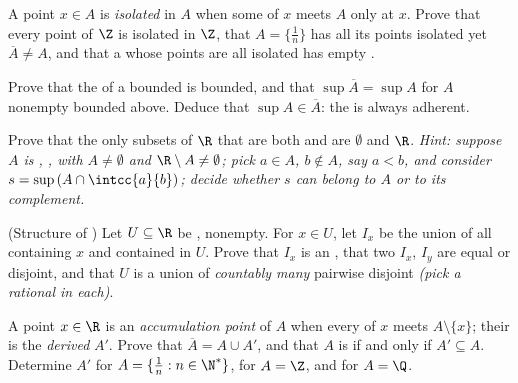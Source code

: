 \begin{exercise}[$\star\star$]\label{exo:b1:topology:7}
A point $x \in A$ is \emph{isolated} in $A$ when some  of
$x$ meets $A$ only at $x$. Prove that every point of $\Z$ is isolated
in $\Z$, that $A = \{\frac1n\}$ has all its points isolated yet
$\overline A \neq A$, and that a  whose points are all isolated
has empty .
\end{exercise}

\begin{exercise}[$\star\star$]\label{exo:b1:topology:8}
Prove that the  of a bounded  is bounded, and that
$\sup \overline A = \sup A$ for $A$ nonempty bounded above. Deduce
that $\sup A \in \overline A$: the  is always adherent.
\end{exercise}

\begin{exercise}[$\star\star\star$]\label{exo:b1:topology:9}
Prove that the only subsets of $\R$ that are both  and  are
$\emptyset$ and $\R$. \emph{Hint: suppose $A$ is , , with
$A \neq \emptyset$ and $\R \setminus A \neq \emptyset$; pick $a \in
A$, $b \notin A$, say $a < b$, and consider $s = \sup\,(A \cap
\intcc{a}{b})$; decide whether $s$ can belong to $A$ or to its
complement.}
\end{exercise}

\begin{exercise}[$\star\star\star$]\label{exo:b1:topology:10}
(Structure of ) Let $U \subseteq \R$ be , nonempty. For
$x \in U$, let $I_x$ be the union of all   containing
$x$ and contained in $U$. Prove that $I_x$ is an  , that
two  $I_x$, $I_y$ are equal or disjoint, and that $U$ is a union
of \emph{countably many} pairwise disjoint   \emph{(pick
a rational in each)}.
\end{exercise}

\begin{exercise}[$\star\star$]\label{exo:b1:topology:11}
A point $x \in \R$ is an \emph{accumulation point} of $A$ when
every  of $x$ meets $A \setminus \{x\}$; their  is
the \emph{derived } $A'$. Prove that $\overline A = A \cup A'$,
and that $A$ is  if and only if $A' \subseteq A$. Determine
$A'$ for $A = \{\frac 1n : n \in \N^*\}$, for $A = \Z$, and for
$A = \Q$.
\end{exercise}

